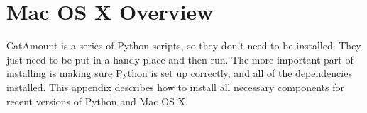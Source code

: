 \chapter{Mac OS X Overview}
\hypertarget{macosx-overview}{}

CatAmount is a series of Python scripts, so they don't need to be
installed. They just need to be put in a handy place and then run.
The more important part of installing is making sure Python is
set up correctly, and all of the dependencies installed. This
appendix describes how to install all necessary components
for recent versions of Python and Mac OS X.
